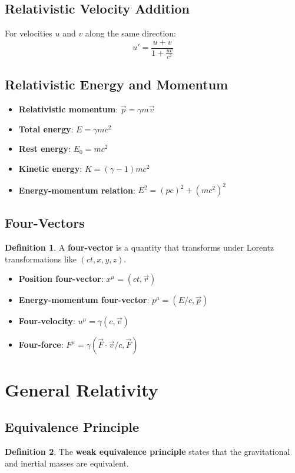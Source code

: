 \documentclass[11pt]{article}
\theoremstyle{definition}
\newtheorem{definition}{Definition}[section]
\begin{document}
\subsection{Relativistic Velocity Addition}
For velocities $u$ and $v$ along the same direction:
$$u' = \frac{u + v}{1 + \frac{uv}{c^2}}$$

\subsection{Relativistic Energy and Momentum}
\begin{itemize}
    \item \textbf{Relativistic momentum}: $\vec{p} = \gamma m \vec{v}$
    \item \textbf{Total energy}: $E = \gamma mc^2$
    \item \textbf{Rest energy}: $E_0 = mc^2$
    \item \textbf{Kinetic energy}: $K = (\gamma - 1)mc^2$
    \item \textbf{Energy-momentum relation}: $E^2 = (pc)^2 + (mc^2)^2$
\end{itemize}

\subsection{Four-Vectors}
\begin{definition}
A \textbf{four-vector} is a quantity that transforms under Lorentz transformations like $(ct, x, y, z)$.
\end{definition}

\begin{itemize}
    \item \textbf{Position four-vector}: $x^\mu = (ct, \vec{r})$
    \item \textbf{Energy-momentum four-vector}: $p^\mu = (E/c, \vec{p})$
    \item \textbf{Four-velocity}: $u^\mu = \gamma(c, \vec{v})$
    \item \textbf{Four-force}: $F^\mu = \gamma(\vec{F} \cdot \vec{v}/c, \vec{F})$
\end{itemize}

\section{General Relativity}

\subsection{Equivalence Principle}
\begin{definition}
The \textbf{weak equivalence principle} states that the gravitational and inertial masses are equivalent.
\end{definition}
\end{document}
